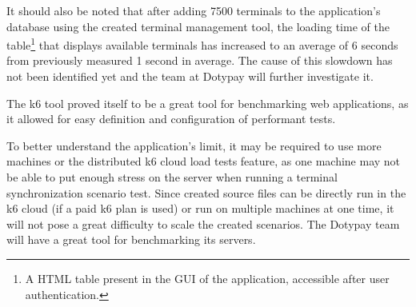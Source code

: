\documentclass[12pt, a4paper]{article}
\begin{document}
It should also be noted that after adding 7500 terminals to the application's database using the created terminal management tool, the loading time of the table\footnote{A HTML table present in the GUI of the application, accessible after user authentication.} that displays available terminals has increased to an average of 6 seconds from previously measured 1 second in average.
The cause of this slowdown has not been identified yet and the team at Dotypay will further investigate it.

The k6 tool proved itself to be a great tool for benchmarking web applications, as it allowed for easy definition and configuration of performant tests. 

To better understand the application's limit, it may be required to use more machines or the distributed k6 cloud load tests feature, as one machine may not be able to put enough stress on the server when running a terminal synchronization scenario test.
Since created source files can be directly run in the k6 cloud (if a paid k6 plan is used) or run on multiple machines at one time, it will not pose a great difficulty to scale the created scenarios. The Dotypay team will have a great tool for benchmarking its servers.
\end{document}
